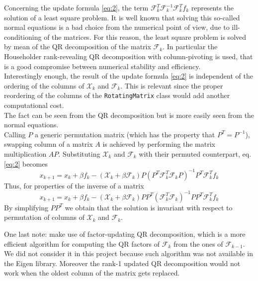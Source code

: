\documentclass[12pt]{article}
\begin{document}
		Concerning the update formula \ref{eq:2}, the term $\mathscr{F}_k^T \mathscr{F}_k^{-1}\mathscr{F}_k^T f_k$
		represents the solution of a least square problem. It is well known that solving this so-called normal
		equations is a bad choice from the numerical point of view, due to ill-conditioning of the matrices.
		For this reason, the least square problem is solved by mean of the QR decomposition of the matrix $\mathscr{F}_k$. In particular the
		Householder rank-revealing QR decomposition with column-pivoting is used, that is a good compromise
		between numerical stability and efficiency.\\
		Interestingly enough, the result of the update formula \ref{eq:2} is independent of the ordering of the columns
		of $\mathscr{X}_k$ and $\mathscr{F}_k$. This is relevant since 
		the proper reordering of the columns of the \verb|RotatingMatrix| class would add another computational cost.\\		
		The fact can be seen from the QR decomposition but is more easily seen from the normal equations.\\
		Calling $P$ a generic permutation matrix (which has the property
		that $P^T=P^{-1}$), swapping column of a matrix $A$ is achieved by performing the matrix multiplication $AP$.
		Substituting $\mathscr{X}_k$ and $\mathscr{F}_k$ with their permuted counterpart, eq. \ref{eq:2} becomes
		\begin{equation}
			x_{k+1}=x_{k} + \beta f_k -(\mathscr{X}_k + \beta \mathscr{F}_k)P(P^T \mathscr{F}_k^T \mathscr{F}_k P)^{-1}P^T \mathscr{F}_k^T f_k
		\end{equation}
		Thus, for properties of the inverse of a matrix
		\begin{equation}
			x_{k+1}=x_{k} + \beta f_k -(\mathscr{X}_k + \beta \mathscr{F}_k)P P^T (\mathscr{F}_k^T \mathscr{F}_k)^{-1} P P^T \mathscr{F}_k^T f_k
		\end{equation}
		By simplifying $P P^T$ we obtain that the solution is invariant with respect to permutation of columns of $\mathscr{X}_k$ and $\mathscr{F}_k$.
		
		One last note: \citeauthor{Walker} \cite{Walker} make use of factor-updating QR decomposition, which is a more efficient algorithm
		for computing the QR factors of $\mathscr{F}_k$ from the ones of $\mathscr{F}_{k-1}$. We did not consider it in this project
		because such algorithm was not available in the Eigen library. Moreover the rank-1 updated QR decomposition would not work
		when the oldest column of the matrix gets replaced.
		
\end{document}
